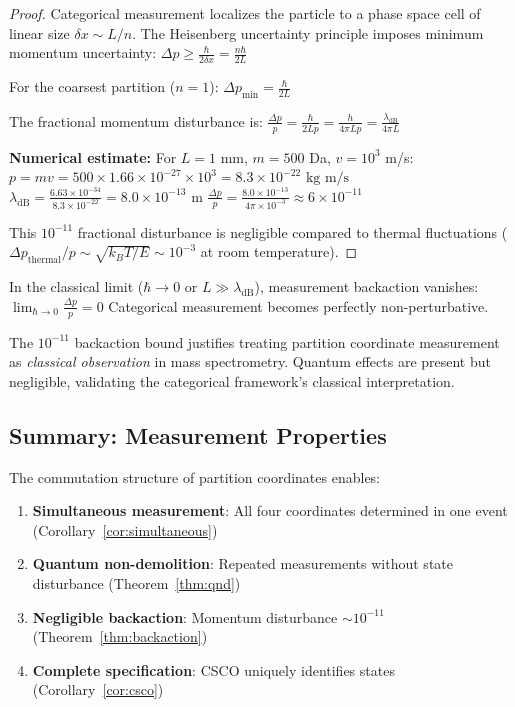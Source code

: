 \begin{proof}
Categorical measurement localizes the particle to a phase space cell of linear size $\delta x \sim L/n$. The Heisenberg uncertainty principle imposes minimum momentum uncertainty:
$
\Delta p \geq \frac{\hbar}{2\delta x} = \frac{n\hbar}{2L}
$

For the coarsest partition ($n = 1$):
$
\Delta p_{\min} = \frac{\hbar}{2L}
$

The fractional momentum disturbance is:
$
\frac{\Delta p}{p} = \frac{\hbar}{2Lp} = \frac{h}{4\pi Lp} = \frac{\lambda_{\mathrm{dB}}}{4\pi L}
$

\textbf{Numerical estimate:} For $L = 1$ mm, $m = 500$ Da, $v = 10^3$ m/s:
$
p = mv = 500 \times 1.66 \times 10^{-27} \times 10^3 = 8.3 \times 10^{-22} \text{ kg m/s}
$
$
\lambda_{\mathrm{dB}} = \frac{6.63 \times 10^{-34}}{8.3 \times 10^{-22}} = 8.0 \times 10^{-13} \text{ m}
$
$
\frac{\Delta p}{p} = \frac{8.0 \times 10^{-13}}{4\pi \times 10^{-3}} \approx 6 \times 10^{-11}
$

This $10^{-11}$ fractional disturbance is negligible compared to thermal fluctuations ($\Delta p_{\mathrm{thermal}}/p \sim \sqrt{k_BT/E} \sim 10^{-3}$ at room temperature).
\end{proof}

\begin{corollary}
\label{cor:classical}
In the classical limit ($\hbar \to 0$ or $L \gg \lambda_{\mathrm{dB}}$), measurement backaction vanishes:
$
\lim_{\hbar \to 0} \frac{\Delta p}{p} = 0
$
Categorical measurement becomes perfectly non-perturbative.
\end{corollary}

\begin{remark}
The $10^{-11}$ backaction bound justifies treating partition coordinate measurement as \emph{classical observation} in mass spectrometry. Quantum effects are present but negligible, validating the categorical framework's classical interpretation.
\end{remark}

\subsection{Summary: Measurement Properties}

The commutation structure of partition coordinates enables:
\begin{enumerate}
    \item \textbf{Simultaneous measurement}: All four coordinates determined in one event (Corollary~\ref{cor:simultaneous})
    \item \textbf{Quantum non-demolition}: Repeated measurements without state disturbance (Theorem~\ref{thm:qnd})
    \item \textbf{Negligible backaction}: Momentum disturbance $\sim 10^{-11}$ (Theorem~\ref{thm:backaction})
    \item \textbf{Complete specification}: CSCO uniquely identifies states (Corollary~\ref{cor:csco})
\end{enumerate}

